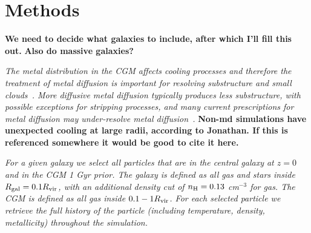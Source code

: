 \documentclass[fleqn,usenatbib]{mnras}
\begin{document}





\section{Methods}
\label{s: methods}

\textbf{We need to decide what galaxies to include, after which I'll fill this out.}
\textbf{Also do massive galaxies?}

\textit{
The metal distribution in the CGM affects cooling processes and therefore the treatment of metal diffusion is important for resolving substructure and small clouds~\cite{rennehan2021}.
More diffusive metal diffusion typically produces less substructure, with possible exceptions for stripping processes, and many current prescriptions for metal diffusion may under-resolve metal diffusion~\citep[e.g.][]{rennehan2019, rennehan2021}.
}
\textbf{Non-md simulations have unexpected cooling at large radii, according to Jonathan.
If this is referenced somewhere it would be good to cite it here.}

\textit{
For a given galaxy we select all particles that are in the central galaxy at $z=0$ and in the CGM 1 Gyr prior.
The galaxy is defined as all gas and stars inside $R_{\rm gal} = 0.1 R_{\rm vir}$, with an additional density cut of $n_{\rm H} = 0.13$ cm$^{-3}$ for gas.
The CGM is defined as all gas inside $0.1 -1 R_{\rm vir}$.
For each selected particle we retrieve the full history of the particle (including temperature, density, metallicity) throughout the simulation.
}
\end{document}
